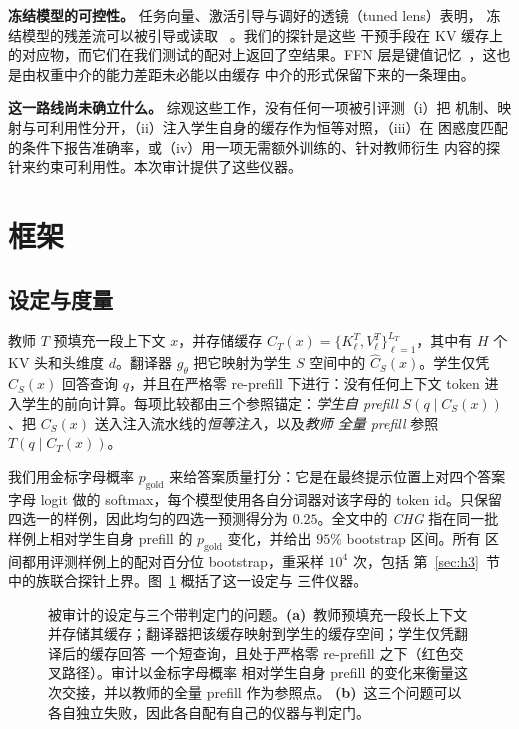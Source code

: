 \documentclass[10pt,a4paper,fontset=fandol]{ctexart}
\newcommand{\kv}{\ensuremath{\mathrm{KV}}}
\newcommand{\gold}{\ensuremath{p_{\mathrm{gold}}}}
\begin{document}
\textbf{冻结模型的可控性。} 任务向量、激活引导与调好的透镜（tuned lens）表明，
冻结模型的残差流可以被引导或读取
~\citep{taskvectors2023,actsteer2024,tunedlens2023,gist2023}。我们的探针是这些
干预手段在 \kv{} 缓存上的对应物，而它们在我们测试的配对上返回了空结果。FFN
层是键值记忆~\citep{ffnmemory2021}，这也是由权重中介的能力差距未必能以由缓存
中介的形式保留下来的一条理由。

\textbf{这一路线尚未确立什么。} 综观这些工作，没有任何一项被引评测（i）把
机制、映射与可利用性分开，（ii）注入学生自身的缓存作为恒等对照，（iii）在
困惑度匹配的条件下报告准确率，或（iv）用一项无需额外训练的、针对教师衍生
内容的探针来约束可利用性。本次审计提供了这些仪器。

\section{框架}
\label{sec:framework}

\subsection{设定与度量}

教师 $T$ 预填充一段上下文 $x$，并存储缓存
$C_T(x)=\{K^T_\ell,V^T_\ell\}_{\ell=1}^{L_T}$，其中有 $H$ 个 \kv{} 头和头维度
$d$。翻译器 $g_\theta$ 把它映射为学生 $S$ 空间中的 $\widehat C_S(x)$。学生仅凭
$\widehat C_S(x)$ 回答查询 $q$，并且在严格零 re-prefill 下进行：没有任何上下文
token 进入学生的前向计算。每项比较都由三个参照锚定：\emph{学生自 prefill}
$S(q\mid C_S(x))$、把 $C_S(x)$ 送入注入流水线的\emph{恒等注入}，以及\emph{教师
全量 prefill} 参照 $T(q\mid C_T(x))$。

我们用金标字母概率 $\gold$ 来给答案质量打分：它是在最终提示位置上对四个答案
字母 logit 做的 softmax，每个模型使用各自分词器对该字母的 token id。只保留
四选一的样例，因此均匀的四选一预测得分为 $0.25$。全文中的 \emph{CHG} 指在同一批
样例上相对学生自身 prefill 的 $\gold$ 变化，并给出 $95\%$ bootstrap 区间。所有
区间都用评测样例上的配对百分位 bootstrap，重采样 $10^4$ 次，包括
第~\ref{sec:h3}~节中的族联合探针上界。图~\ref{fig:framework} 概括了这一设定与
三件仪器。

\begin{figure}[t]
\centering

\caption{被审计的设定与三个带判定门的问题。\textbf{(a)}~教师预填充一段长上下文
并存储其缓存；翻译器把该缓存映射到学生的缓存空间；学生仅凭翻译后的缓存回答
一个短查询，且处于严格零 re-prefill 之下（红色交叉路径）。审计以金标字母概率
相对学生自身 prefill 的变化来衡量这次交接，并以教师的全量 prefill 作为参照点。
\textbf{(b)}~这三个问题可以各自独立失败，因此各自配有自己的仪器与判定门。}
\label{fig:framework}
\end{figure}
\end{document}
